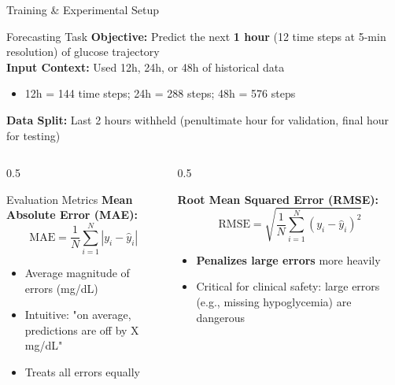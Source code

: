 \documentclass[aspectratio=169,xcolor=dvipsnames]{beamer}
\begin{document}
\begin{frame}{Training \& Experimental Setup}
    \begin{block}{Forecasting Task}
        \textbf{Objective:} Predict the next \textbf{1 hour} (12 time steps at 5-min resolution) of glucose trajectory \\
        \textbf{Input Context:} Used 12h, 24h, or 48h of historical data
        \begin{itemize}
            \item 12h = 144 time steps; 24h = 288 steps; 48h = 576 steps
        \end{itemize}
        \textbf{Data Split:} Last 2 hours withheld (penultimate hour for validation, final hour for testing)
    \end{block}
    
    \begin{columns}
        \begin{column}{0.5\textwidth}
            \begin{block}{Evaluation Metrics}
                \textbf{Mean Absolute Error (MAE):}
                $$\text{MAE} = \frac{1}{N} \sum_{i=1}^{N} |y_i - \hat{y}_i|$$
                \begin{itemize}
                    \item Average magnitude of errors (mg/dL)
                    \item Intuitive: "on average, predictions are off by X mg/dL"
                    \item Treats all errors equally
                \end{itemize}
            \end{block}
        \end{column}
        
        \begin{column}{0.5\textwidth}
            \begin{block}{}
                \textbf{Root Mean Squared Error (RMSE):}
                $$\text{RMSE} = \sqrt{\frac{1}{N} \sum_{i=1}^{N} (y_i - \hat{y}_i)^2}$$
                \begin{itemize}
                    \item \textbf{Penalizes large errors} more heavily
                    \item Critical for clinical safety: large errors (e.g., missing hypoglycemia) are dangerous
                \end{itemize}
            \end{block}
        \end{column}
    \end{columns}
    

\end{frame}
\end{document}
